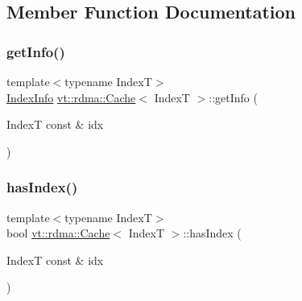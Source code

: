 \subsection{Member Function Documentation}
\mbox{\label{structvt_1_1rdma_1_1_cache_a104e7024e31f8c145e12c0e98e6593d0}} 
\subsubsection{\texorpdfstring{get\+Info()}{getInfo()}}
{\footnotesize\ttfamily template$<$typename IndexT$>$ \\
\hyperlink{structvt_1_1rdma_1_1_index_info}{Index\+Info} \hyperlink{structvt_1_1rdma_1_1_cache}{vt\+::rdma\+::\+Cache}$<$ IndexT $>$\+::get\+Info (\begin{DoxyParamCaption}\item[{IndexT const \&}]{idx }\end{DoxyParamCaption})\hspace{0.3cm}{\ttfamily [inline]}}

\mbox{\label{structvt_1_1rdma_1_1_cache_ab67a0c4c650e06a0581a6ddd41a5313b}} 
\subsubsection{\texorpdfstring{has\+Index()}{hasIndex()}}
{\footnotesize\ttfamily template$<$typename IndexT$>$ \\
bool \hyperlink{structvt_1_1rdma_1_1_cache}{vt\+::rdma\+::\+Cache}$<$ IndexT $>$\+::has\+Index (\begin{DoxyParamCaption}\item[{IndexT const \&}]{idx }\end{DoxyParamCaption})\hspace{0.3cm}{\ttfamily [inline]}}

\mbox{\label{structvt_1_1rdma_1_1_cache_a855d0107608982399063f2ad1760862b}} 
